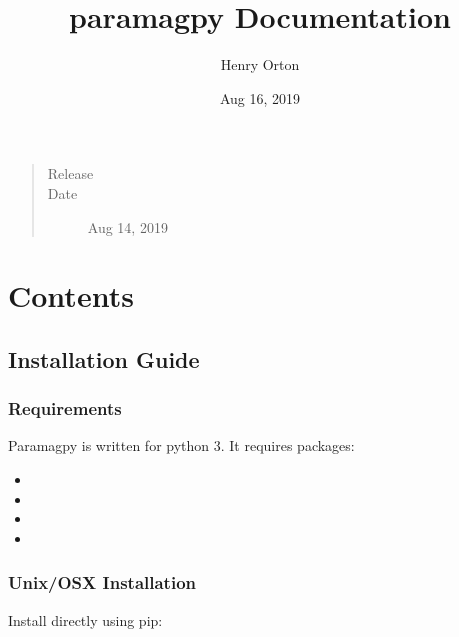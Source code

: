 \documentclass[a4paper,10pt,english]{sphinxmanual}
\title{paramagpy Documentation}
\date{Aug 16, 2019}
\author{Henry Orton}
\begin{document}
\pagestyle{empty}
\maketitle
\pagestyle{plain}
\sphinxtableofcontents
\pagestyle{normal}
\label{\detokenize{index::doc}}

\begin{quote}\begin{description}
\item[{Release}] 

\item[{Date}] \leavevmode
Aug 14, 2019

\end{description}\end{quote}


\chapter{Contents}
\label{\detokenize{index:contents}}

\section{Installation Guide}
\label{\detokenize{install:installation-guide}}\label{\detokenize{install::doc}}

\subsection{Requirements}
\label{\detokenize{install:requirements}}
Paramagpy is written for python 3. It requires packages:
\begin{itemize}
\item {} 

\item {} 

\item {} 

\item {} 

\end{itemize}


\subsection{Unix/OSX Installation}
\label{\detokenize{install:unix-osx-installation}}
Install directly using pip:
\end{document}
